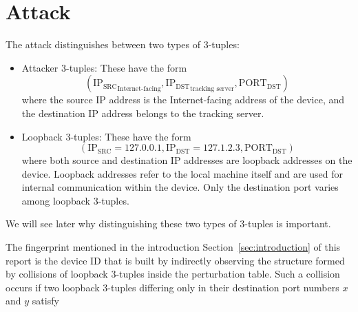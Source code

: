 \documentclass{report}
\begin{document}
\begin{center}
	\begin{minipage}[t]{0.5\textwidth}
		\vspace{0cm}

		
	\end{minipage}
\end{center}


\vspace{0.5cm}
\chapter{Attack}
\label{sec:attack}

The attack distinguishes between two types of 3-tuples:

\begin{itemize}
	\item \alert{Attacker 3-tuples:} These have the form
	\begin{equation*}
		(\mathrm{IP_{SRC}}_{\text{Internet-facing}}, \mathrm{IP_{DST}}_{\text{tracking server}}, \mathrm{PORT_{DST}})
	\end{equation*}
	where the source IP address is the Internet-facing address of the device, and the destination IP address belongs to the tracking server.

	\item \alert{Loopback 3-tuples:} These have the form
	\begin{equation*}
		(\mathrm{IP_{SRC}} = 127.0.0.1, \mathrm{IP_{DST}} = 127.1.2.3, \mathrm{PORT_{DST}})
	\end{equation*}
	where both source and destination IP addresses are loopback addresses on the device. \alert{Loopback addresses} refer to the local machine itself and are used for internal communication within the device. Only the \alert{destination port} varies among loopback 3-tuples.
\end{itemize}

We will see later why distinguishing these two types of 3-tuples is important.

The fingerprint mentioned in the introduction Section~\ref{sec:introduction} of this report is the \alert{device ID} that is built by indirectly observing the structure formed by \alert{collisions of loopback 3-tuples} inside the perturbation table. Such a collision occurs if two loopback 3-tuples differing only in their destination port numbers $x$ and $y$ satisfy
\end{document}
